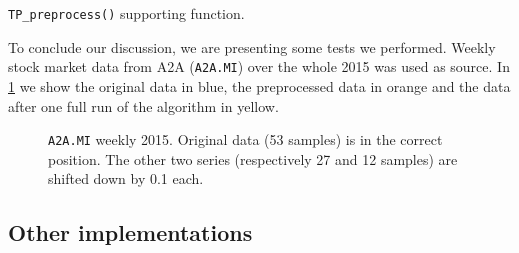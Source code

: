 \documentclass[a4paper]{article}
\begin{document}
\begin{listing}[H]
 
\inputminted[firstline = 53, lastline = 78]{matlab}{../code/TurningPoints.m}

\caption{\texttt{TP\_preprocess()} supporting function.}\label{lst:preprocess}

\end{listing}


To conclude our discussion, we are presenting some tests we performed. Weekly stock market data from A2A (\texttt{A2A.MI}) over the whole 2015 was used as source. In \cref{fig:a2a_w_2015} we show the original data in blue, the preprocessed data in orange and the data after one full run of the algorithm in yellow. %

\begin{figure}[H]
	
	
	\caption{\texttt{A2A.MI} weekly 2015. Original data (53 samples) is in the correct position. The other two series (respectively 27 and 12 samples) are shifted down by 0.1 each.}
	
	\label{fig:a2a_w_2015}

\end{figure}


\subsection{Other implementations} 
\lipsum[4-6]


\printbibliography[title={Bibliography}, prenote=prenote]
\end{document}
